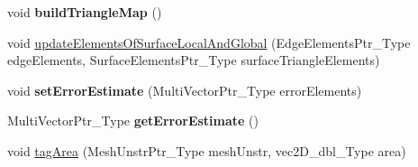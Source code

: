 \begin{DoxyCompactItemize}
\mbox{\label{classFEDD_1_1ErrorEstimation_a7e8a1cc1c97331aef603e68f71fb762f}} 
void {\bfseries build\+Triangle\+Map} ()
\item 
void \hyperlink{classFEDD_1_1ErrorEstimation_a7c5f51c68832bb8ec28480139a68d81f}{update\+Elements\+Of\+Surface\+Local\+And\+Global} (Edge\+Elements\+Ptr\+\_\+\+Type edge\+Elements, Surface\+Elements\+Ptr\+\_\+\+Type surface\+Triangle\+Elements)
\item 
\mbox{\label{classFEDD_1_1ErrorEstimation_a1d8c4a8c220a37e54053201d5c5e3be6}} 
void {\bfseries set\+Error\+Estimate} (Multi\+Vector\+Ptr\+\_\+\+Type error\+Elements)
\item 
\mbox{\label{classFEDD_1_1ErrorEstimation_a907047cee0ce105a6a689860ec6f3ce0}} 
Multi\+Vector\+Ptr\+\_\+\+Type {\bfseries get\+Error\+Estimate} ()
\item 
void \hyperlink{classFEDD_1_1ErrorEstimation_abb5e9b4f422aabf83c1558ddab16611c}{tag\+Area} (Mesh\+Unstr\+Ptr\+\_\+\+Type mesh\+Unstr, vec2\+D\+\_\+dbl\+\_\+\+Type area)
\end{DoxyCompactItemize}
